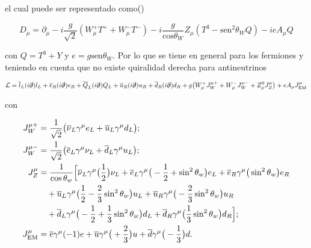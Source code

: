 el cual puede ser representado como(\cite{peskin2018introduction})

$$ D_{\mu} = \partial_{\mu} -i\frac{g}{\sqrt{2}}(W_{\mu}^{+}T^{+} + W_{\mu}^{-}T^{-}) - i\frac{g}{\text{cos}\theta_W}Z_{\mu}(T^3 - \text{sen}^2 \theta_W Q) - ieA_{\mu}Q $$

con $Q=T^3+Y$ y $e=g\text{sen}\theta_W$. Por lo que se tiene en general para los fermiones y teniendo en cuenta que no existe quiralidad derecha para antineutrinos

\begin{equation}
    \mathcal{L} = 
\overline{l}_L (i \slashed{\partial}) l_L + 
\overline{e}_R (i \slashed{\partial}) e_R + 
\overline{Q}_L (i \slashed{\partial}) Q_L + 
\overline{u}_R (i \slashed{\partial}) u_R + 
\overline{d}_R (i \slashed{\partial}) d_R \\
+ g \big(W_\mu^+ J_W^{\mu+} + W_\mu^- J_W^{\mu-} + Z_\mu^0 J_Z^\mu\big) + e A_\mu J_\text{EM}^\mu
\end{equation}

con 

\begin{align}
    J_W^{\mu+} &= \frac{1}{\sqrt{2}} \big( \overline{\nu}_L \gamma^\mu e_L + \overline{u}_L \gamma^\mu d_L \big); \\
    J_W^{\mu-} &= \frac{1}{\sqrt{2}} \big( \overline{e}_L \gamma^\mu \nu_L + \overline{d}_L \gamma^\mu u_L \big); \\
    J_Z^\mu &= \frac{1}{\cos \theta_w} \Big[
        \overline{\nu}_L \gamma^\mu \big( \frac{1}{2} \big) \nu_L + 
        \overline{e}_L \gamma^\mu \big( -\frac{1}{2} + \sin^2 \theta_w \big) e_L + 
        \overline{e}_R \gamma^\mu \big( \sin^2 \theta_w \big) e_R \notag \\
        &\quad + \overline{u}_L \gamma^\mu \big( \frac{1}{2} - \frac{2}{3} \sin^2 \theta_w \big) u_L + 
        \overline{u}_R \gamma^\mu \big( -\frac{2}{3} \sin^2 \theta_w \big) u_R \notag \\
        &\quad + \overline{d}_L \gamma^\mu \big( -\frac{1}{2} + \frac{1}{3} \sin^2 \theta_w \big) d_L + 
        \overline{d}_R \gamma^\mu \big( \frac{1}{3} \sin^2 \theta_w \big) d_R 
    \Big]; \\
    J_\text{EM}^\mu &= \overline{e} \gamma^\mu (-1) e + 
    \overline{u} \gamma^\mu \big( +\frac{2}{3} \big) u + 
    \overline{d} \gamma^\mu \big( -\frac{1}{3} \big) d.
\end{align}